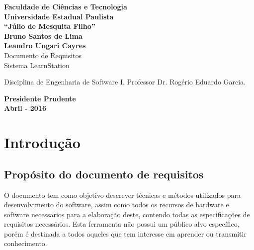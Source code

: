 \documentclass[12pt,a4paper,onecolumn,titlepage]{article}
\begin{document}

\begin{titlepage} %
	
	\vfill
	\begin{center}
	
		{\large \textbf{Faculdade de Ciências e Tecnologia\\Universidade Estadual Paulista\\``Júlio de Mesquita Filho''}} \\[3cm]
		{\large \textbf{Bruno Santos de Lima}}\\
		{\large \textbf{Leandro Ungari Cayres}}\\[4cm]
		{\Large Documento de Requisitos}\\
		{\Large Sistema LearnStation}\\[4cm]

	\hspace{.45\textwidth} %
	\begin{minipage}{.5\textwidth}
		\large Disciplina de Engenharia de Software I. Professor Dr. Rogério Eduardo Garcia.\\[0.5cm]
	\end{minipage}

	\vfill
	\vspace{1.5cm}
	
	\large \textbf{Presidente Prudente\\}
	\large \textbf{Abril - 2016}
	
	\end{center}
	
\end{titlepage}

\section{Introdução}
\label{sect:intro}

\subsection{Propósito do documento de requisitos}

O documento tem como objetivo descrever técnicas e métodos utilizados para desenvolvimento do software, assim como todos os recursos de hardware e software necessarios para a elaboração deste, contendo todas as especificações de requisitos necessários. Esta ferramenta não possui um público alvo específico, porém é destinada a todos aqueles que tem interesse em aprender ou transmitir conhecimento.
\end{document}
